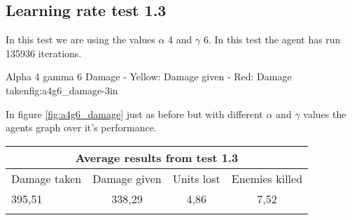 
\subsection*{Learning rate test 1.3}
In this test we are using the values $\alpha$ 4 and $\gamma$ 6. In this test the agent has run 135936 iterations.


			{Alpha 4 gamma 6 Damage - Yellow: Damage given - Red: Damage taken}{fig:a4g6_damage}{-3in}

In figure \ref{fig:a4g6_damage} just as before but with different $\alpha$ and $\gamma$ values the agents graph over it's performance.




\begin{centering}
 \begin{tabular}{|l||c|c|c|}
	\multicolumn{4}{c}{Average results from test 1.3} \\
	\hline
		Damage taken & Damage given & Units lost & Enemies killed\\
	\hline
		395,51 & 338,29 & 4,86 & 7,52 \\
	\hline
\label{test1.3}
\end{tabular}
\end{centering}


